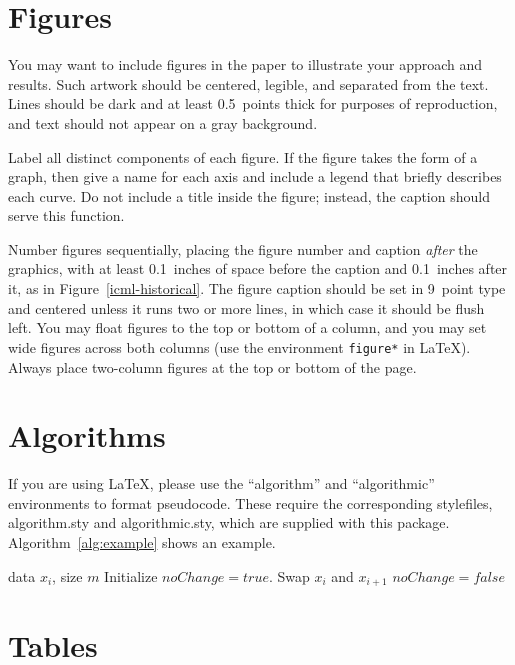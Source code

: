 \documentclass{article}
\begin{document}
\section{Figures}

You may want to include figures in the paper to illustrate
your approach and results. Such artwork should be centered,
legible, and separated from the text. Lines should be dark and at
least 0.5~points thick for purposes of reproduction, and text should
not appear on a gray background.

Label all distinct components of each figure. If the figure takes the
form of a graph, then give a name for each axis and include a legend
that briefly describes each curve. Do not include a title inside the
figure; instead, the caption should serve this function.

Number figures sequentially, placing the figure number and caption
\emph{after} the graphics, with at least 0.1~inches of space before
the caption and 0.1~inches after it, as in
Figure~\ref{icml-historical}. The figure caption should be set in
9~point type and centered unless it runs two or more lines, in which
case it should be flush left. You may float figures to the top or
bottom of a column, and you may set wide figures across both columns
(use the environment \texttt{figure*} in \LaTeX). Always place
two-column figures at the top or bottom of the page.

\section{Algorithms}

If you are using \LaTeX, please use the ``algorithm'' and ``algorithmic''
environments to format pseudocode. These require
the corresponding stylefiles, algorithm.sty and
algorithmic.sty, which are supplied with this package.
Algorithm~\ref{alg:example} shows an example.

\begin{algorithm}[tb]
   \caption{Bubble Sort}
   \label{alg:example}
\begin{algorithmic}
    data $x_i$, size $m$
   \REPEAT
   \STATE Initialize $noChange = true$.
   \STATE Swap $x_i$ and $x_{i+1}$
   \STATE $noChange = false$
   \ENDIF
   \ENDFOR
\end{algorithmic}
\end{algorithm}

\section{Tables}
\end{document}
